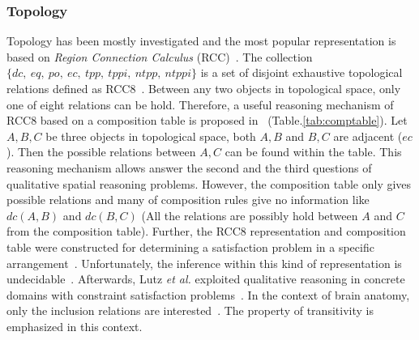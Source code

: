 \documentclass{article}
\begin{document}
\subsubsection{Topology}
Topology has been mostly investigated and the most popular representation is based on \textit{Region Connection Calculus} (RCC)~\cite{cohn1997qualitative}.
The collection $\{dc,~eq,~po,~ec,~tpp,~tppi,~ntpp,~ntppi\}$ is a set of disjoint exhaustive topological relations defined as RCC8~\cite{randell1992spatial}.
Between any two objects in topological space, only one of eight relations can be hold.
Therefore, a useful reasoning mechanism of RCC8 based on a composition table is proposed in~\cite{egenhofer1991reasoning} (Table.\ref{tab:comptable}).
Let $A,B,C$ be three objects in topological space, both $A,B$ and $B,C$ are adjacent ($ec$). Then the possible relations between $A,C$ can be found within the table.
This reasoning mechanism allows answer the second and the third questions of qualitative spatial reasoning problems. 
However, the composition table only gives possible relations and many of composition rules give no information like $dc(A,B)$ and $dc(B,C)$ (All the relations are possibly
hold between $A$ and $C$ from the composition table).
Further, the RCC8 representation and composition table were constructed for determining a satisfaction problem 
in a specific arrangement~\cite{wessel2000obstacle,wessel00alcra}.
Unfortunately, the inference within this kind of representation is undecidable~\cite{wessel2000obstacle}. 
Afterwards, Lutz \textit{et al.} exploited qualitative reasoning in concrete domains with constraint satisfaction problems~\cite{lutz2007tableau}.
In the context of brain anatomy, only the inclusion relations are interested~\cite{santos2012region}.
The property of transitivity  is emphasized in this context. 
\end{document}
